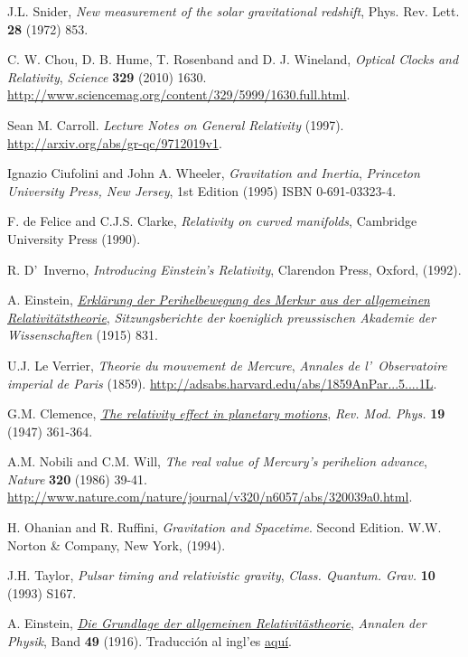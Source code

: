 \begin{thebibliography}{99}
 J.L. Snider, {\em New measurement of the solar gravitational redshift}, {\rm Phys. Rev. Lett.} {\bf 28} (1972) 853.

 C. W. Chou, D. B. Hume, T. Rosenband and D. J. Wineland, {\em Optical Clocks and Relativity}, {\sl Science} {\bf 329} (2010) 1630. \url{http://www.sciencemag.org/content/329/5999/1630.full.html}.

 Sean M. Carroll. {\it Lecture Notes on General Relativity} (1997). \url{http://arxiv.org/abs/gr-qc/9712019v1}.

 Ignazio Ciufolini and John A. Wheeler, {\it Gravitation and Inertia},
{\sl Princeton University Press, New Jersey}, 1st Edition (1995) ISBN 0-691-03323-4.

 F. de Felice and C.J.S. Clarke, {\em Relativity on curved manifolds}, Cambridge University Press (1990).

 R. D'~Inverno, {\em Introducing Einstein's Relativity}, Clarendon Press, Oxford, (1992).



 A. Einstein, \href{https://docs.google.com/open?id=0B4RSIcYW5V0Hd0haajhUS0tRems}{\it Erkl\"arung der Perihelbewegung des Merkur aus der allgemeinen Relativit\"atstheorie}, {\sl Sitzungsberichte der koeniglich preussischen Akademie der Wissenschaften} (1915) 831.

 U.J. Le Verrier, {\em Theorie du mouvement de Mercure}, {\sl Annales de l'\ Observatoire imperial de Paris}  (1859). \url{http://adsabs.harvard.edu/abs/1859AnPar...5....1L}.

 G.M. Clemence, \href{http://rmp.aps.org/abstract/RMP/v19/i4/p361_1}{\it The relativity effect in planetary motions}, {\sl Rev. Mod. Phys.} {\bf 19} (1947) 361-364.

 A.M. Nobili and C.M. Will, {\it The real value of Mercury's perihelion advance}, {\sl Nature} {\bf 320} (1986) 39-41. \url{http://www.nature.com/nature/journal/v320/n6057/abs/320039a0.html}.

 H. Ohanian and R. Ruffini, {\em Gravitation and Spacetime}. Second Edition. W.W. Norton \& Company, New York, (1994).

 J.H. Taylor, {\em Pulsar timing and relativistic gravity}, {\sl Class. Quantum. Grav.} {\bf 10}  (1993) S167.

 A. Einstein, \href{https://docs.google.com/open?id=0B4RSIcYW5V0HMWY1YzM2MjAtMmJhMy00NmQ5LWFhMjEtNjdlODhhNjcxZTFk}{\it Die Grundlage der allgemeinen Relativitästheorie}, {\sl Annalen der Physik}, Band {\bf 49} (1916). Traducción al ingl'es \href{http://goo.gl/E2YFn}{aqu\'i}.


\end{thebibliography}
